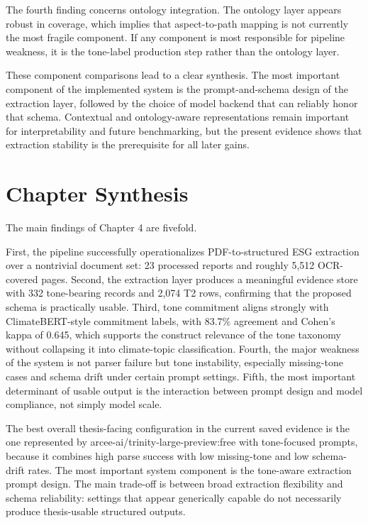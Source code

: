 The fourth finding concerns ontology integration. The ontology layer appears robust in coverage, which implies that aspect-to-path mapping is not currently the most fragile component. If any component is most responsible for pipeline weakness, it is the tone-label production step rather than the ontology layer.

These component comparisons lead to a clear synthesis. The most important component of the implemented system is the prompt-and-schema design of the extraction layer, followed by the choice of model backend that can reliably honor that schema. Contextual and ontology-aware representations remain important for interpretability and future benchmarking, but the present evidence shows that extraction stability is the prerequisite for all later gains.

\section{Chapter Synthesis}

The main findings of Chapter 4 are fivefold.

First, the pipeline successfully operationalizes PDF-to-structured ESG extraction over a nontrivial document set: 23 processed reports and roughly 5,512 OCR-covered pages. Second, the extraction layer produces a meaningful evidence store with 332 tone-bearing records and 2,074 T2 rows, confirming that the proposed schema is practically usable. Third, tone commitment aligns strongly with ClimateBERT-style commitment labels, with 83.7\% agreement and Cohen’s kappa of 0.645, which supports the construct relevance of the tone taxonomy without collapsing it into climate-topic classification. Fourth, the major weakness of the system is not parser failure but tone instability, especially missing-tone cases and schema drift under certain prompt settings. Fifth, the most important determinant of usable output is the interaction between prompt design and model compliance, not simply model scale.

The best overall thesis-facing configuration in the current saved evidence is the one represented by arcee-ai/trinity-large-preview:free with tone-focused prompts, because it combines high parse success with low missing-tone and low schema-drift rates. The most important system component is the tone-aware extraction prompt design. The main trade-off is between broad extraction flexibility and schema reliability: settings that appear generically capable do not necessarily produce thesis-usable structured outputs.

